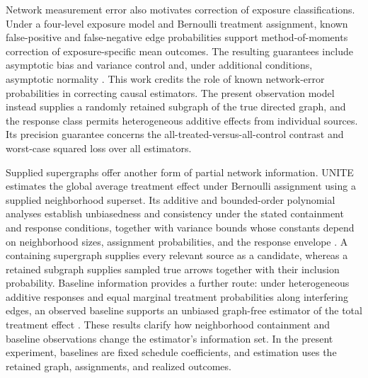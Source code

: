 \documentclass[11pt]{article}
\begin{document}
Network measurement error also motivates correction of exposure classifications. Under a four-level exposure model and Bernoulli treatment assignment, known false-positive and false-negative edge probabilities support method-of-moments correction of exposure-specific mean outcomes. The resulting guarantees include asymptotic bias and variance control and, under additional conditions, asymptotic normality \citep[Section 3; Theorems 4--7]{LiSussmanKolaczyk2021NetworkNoise}. This work credits the role of known network-error probabilities in correcting causal estimators. The present observation model instead supplies a randomly retained subgraph of the true directed graph, and the response class permits heterogeneous additive effects from individual sources. Its precision guarantee concerns the all-treated-versus-all-control contrast and worst-case squared loss over all estimators.

Supplied supergraphs offer another form of partial network information. UNITE estimates the global average treatment effect under Bernoulli assignment using a supplied neighborhood superset. Its additive and bounded-order polynomial analyses establish unbiasedness and consistency under the stated containment and response conditions, together with variance bounds whose constants depend on neighborhood sizes, assignment probabilities, and the response envelope \citep[Theorems 1, 4, and 8; Appendix B.1]{ShankarEtAl2024UNITE}. A containing supergraph supplies every relevant source as a candidate, whereas a retained subgraph supplies sampled true arrows together with their inclusion probability. Baseline information provides a further route: under heterogeneous additive responses and equal marginal treatment probabilities along interfering edges, an observed baseline supports an unbiased graph-free estimator of the total treatment effect \citep[Corollary 3]{YuAiroldiBorgsChayes2022}. These results clarify how neighborhood containment and baseline observations change the estimator's information set. In the present experiment, baselines are fixed schedule coefficients, and estimation uses the retained graph, assignments, and realized outcomes.
\end{document}
